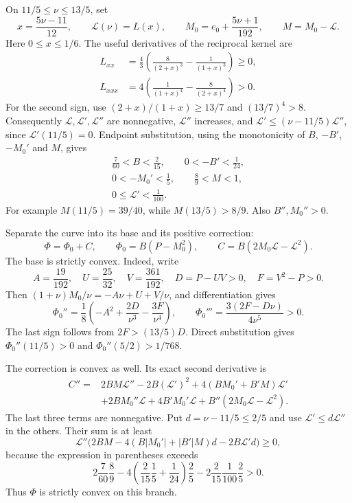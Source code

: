 On $11/5\le\nu\le13/5$, set
\[
 x=\frac{5\nu-11}{12},\qquad \mathcal L(\nu)=L(x),\qquad
 M_0=e_0+\frac{5\nu+1}{192},\qquad M=M_0-\mathcal L.
\]
Here $0\le x\le1/6$. The useful derivatives of the reciprocal kernel are
\begin{align*}
 L_{xx}&=\frac43\left(\frac8{(2+x)^3}-\frac1{(1+x)^3}\right)\ge0,\\
 L_{xxx}&=4\left(\frac1{(1+x)^4}-\frac8{(2+x)^4}\right)>0.
\end{align*}
For the second sign, use $(2+x)/(1+x)\ge13/7$ and $(13/7)^4>8$.
Consequently $\mathcal L,\mathcal L',\mathcal L''$ are nonnegative,
$\mathcal L''$ increases, and
$\mathcal L'\le(\nu-11/5)\mathcal L''$, since $\mathcal L'(11/5)=0$.
Endpoint substitution, using the monotonicity of $B$, $-B'$, $-M_0'$ and $M$, gives
\begin{gather*}
 \frac7{60}<B<\frac2{15},\qquad 0<-B'<\frac1{24},\\
 0<-M_0'<\frac15,\qquad \frac89<M<1,\\
 0\le\mathcal L'<\frac1{100}.
\end{gather*}
For example $M(11/5)=39/40$, while $M(13/5)>8/9$.
Also $B'',M_0''>0$.

Separate the curve into its base and its positive correction:
\[
 \Phi=\Phi_0+C,\qquad
 \Phi_0=B(P-M_0^2),\qquad C=B(2M_0\mathcal L-\mathcal L^2).
\]
The base is strictly convex. Indeed, write
\[
 A=\frac{19}{192},\quad U=\frac{25}{32},\quad V=\frac{361}{192},\quad
 D=P-UV>0,\quad F=V^2-P>0.
\]
Then $(1+\nu)M_0/\nu=-A\nu+U+V/\nu$, and differentiation gives
\[
 \Phi_0''=\frac18\left(-A^2+\frac{2D}{\nu^3}-\frac{3F}{\nu^4}\right),
 \qquad \Phi_0'''=\frac{3(2F-D\nu)}{4\nu^5}>0.
\]
The last sign follows from $2F>(13/5)D$.
Direct substitution gives $\Phi_0''(11/5)>0$ and $\Phi_0''(5/2)>1/768$.

The correction is convex as well. Its exact second derivative is
\begin{align*}
 C''={}&2BM\mathcal L''-2B(\mathcal L')^2
       +4(BM_0'+B'M)\mathcal L'\\
      &+2BM_0''\mathcal L+4B'M_0'\mathcal L
       +B''(2M_0\mathcal L-\mathcal L^2).
\end{align*}
The last three terms are nonnegative. Put $d=\nu-11/5\le2/5$ and use
$\mathcal L'\le d\mathcal L''$ in the others. Their sum is at least
\[
 \mathcal L''\bigl(2BM-4(B|M_0'|+|B'|M)d-2B\mathcal L'd\bigr)\ge0,
\]
because the expression in parentheses exceeds
\[
 2\frac7{60}\frac89
 -4\left(\frac2{15}\frac15+\frac1{24}\right)\frac25
 -2\frac2{15}\frac1{100}\frac25>0.
\]
Thus $\Phi$ is strictly convex on this branch.

